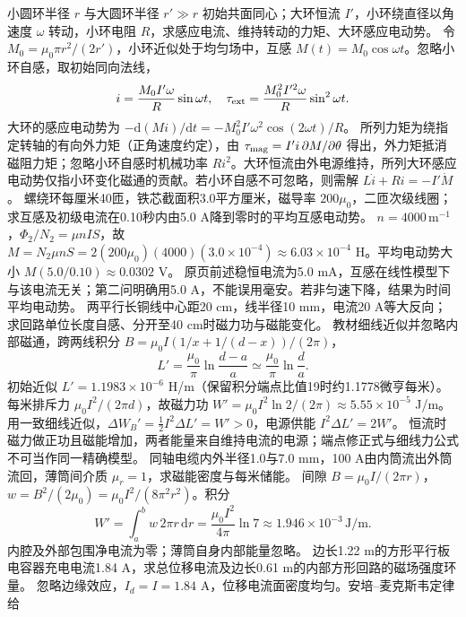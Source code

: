 \problemtext 小圆环半径 $r$ 与大圆环半径 $r'\gg r$ 初始共面同心；大环恒流 $I'$，小环绕直径以角速度 $\omega$ 转动，小环电阻 $R$，求感应电流、维持转动的力矩、大环感应电动势。
\workings 令 $M_0=\mu_0\pi r^2/(2r')$，小环近似处于均匀场中，互感 $M(t)=M_0\cos\omega t$。忽略小环自感，取初始同向法线，
\[
i=\frac{M_0 I'\omega}{R}\sin\omega t,\quad
\tau_{\rm ext}=\frac{M_0^2I'^2\omega}{R}\sin^2\omega t .
\]
大环的感应电动势为 $-\mathrm d(Mi)/\mathrm dt=-M_0^2I'\omega^2\cos(2\omega t)/R$。
\crosscheck 所列力矩为绕指定转轴的有向外力矩（正角速度约定），由 $\tau_{\rm mag}=I'i\,\partial M/\partial\theta$ 得出，外力矩抵消磁阻力矩；忽略小环自感时机械功率 $R i^2$。大环恒流由外电源维持，所列大环感应电动势仅指小环变化磁通的贡献。若小环自感不可忽略，则需解 $L\dot i+Ri=-I'\dot M$。
\problemtext 螺绕环每厘米40匝，铁芯截面积3.0平方厘米，磁导率 $200\mu_0$，二匝次级线圈；求互感及初级电流在0.10秒内由5.0 A降到零时的平均互感电动势。
\workings $n=4000\,\mathrm{m^{-1}}$，$\Phi_2/N_2=\mu nI S$，故 $M=N_2\mu nS=2(200\mu_0)(4000)(3.0\times10^{-4})\approx6.03\times10^{-4}$ H。平均电动势大小 $M(5.0/0.10)\approx0.0302$ V。
\crosscheck 原页前述稳恒电流为5.0 mA，互感在线性模型下与该电流无关；第二问明确用5.0 A，不能误用毫安。若非匀速下降，结果为时间平均电动势。
\problemtext 两平行长铜线中心距20 cm，线半径10 mm，电流20 A等大反向；求回路单位长度自感、分开至40 cm时磁力功与磁能变化。
\workings 教材细线近似并忽略内部磁通，跨两线积分 $B=\mu_0 I(1/x+1/(d-x))/(2\pi)$，
\[
L'=\frac{\mu_0}{\pi}\ln\frac{d-a}{a}\simeq\frac{\mu_0}{\pi}\ln\frac da.
\]
初始近似 $L'=1.1983\times10^{-6}$ H/m（保留积分端点比值19时约1.1778微亨每米）。每米排斥力 $\mu_0 I^2/(2\pi d)$，故磁力功 $W'=\mu_0 I^2\ln2/(2\pi)\approx5.55\times10^{-5}$ J/m。用一致细线近似，$\Delta W_B'=\tfrac12 I^2\Delta L'=W'>0$，电源供能 $I^2\Delta L'=2W'$。
\crosscheck 恒流时磁力做正功且磁能增加，两者能量来自维持电流的电源；端点修正式与细线力公式不可当作同一精确模型。
\problemtext 同轴电缆内外半径1.0与7.0 mm，100 A由内筒流出外筒流回，薄筒间介质 $\mu_r=1$，求磁能密度与每米储能。
\workings 间隙 $B=\mu_0I/(2\pi r)$，$w=B^2/(2\mu_0)=\mu_0 I^2/(8\pi^2r^2)$。积分
\[
W'=\int_a^b w\,2\pi r\,\mathrm dr
=\frac{\mu_0 I^2}{4\pi}\ln7
\approx1.946\times10^{-3}\,\mathrm{J/m}.
\]
\crosscheck 内腔及外部包围净电流为零；薄筒自身内部能量忽略。
\problemtext 边长1.22 m的方形平行板电容器充电电流1.84 A，求总位移电流及边长0.61 m的内部方形回路的磁场强度环量。
\workings 忽略边缘效应，$I_d=I=1.84$ A，位移电流面密度均匀。安培--麦克斯韦定律给

